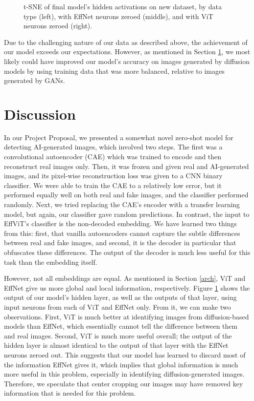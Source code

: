 \documentclass{article} %
\begin{document}
\begin{figure}[h]
\begin{center}
    \end{center}
    \caption{t-SNE of final model's hidden activations on new dataset, by data type (left), with EffNet neurons zeroed (middle), and with ViT neurons zeroed (right).}
    \label{fig:new_data_tsne}
\end{figure}

Due to the challenging nature of our data as described above, the achievement of our model exceeds our expectations. However, as mentioned in Section \ref{discussion}, we most likely could have improved our model's accuracy on images generated by diffusion models by using training data that was more balanced, relative to images generated by GANs.

\section{Discussion}
\label{discussion}

In our Project Proposal, we presented a somewhat novel zero-shot model for detecting AI-generated images, which involved two steps. The first was a convolutional autoencoder (CAE) which was trained to encode and then reconstruct real images only. Then, it was frozen and given real and AI-generated images, and its pixel-wise reconstruction loss was given to a CNN binary classifier. We were able to train the CAE to a relatively low error, but it performed equally well on both real and fake images, and the classifier performed randomly. Next, we tried replacing the CAE's encoder with a transfer learning model, but again, our classifier gave random predictions. In contrast, the input to EffViT's classifier is the non-decoded embedding. We have learned two things from this: first, that vanilla autoencoders cannot capture the subtle differences between real and fake images, and second, it is the decoder in particular that obfuscates these differences. The output of the decoder is much less useful for this task than the embedding itself.

However, not all embeddings are equal. As mentioned in Section \ref{arch}, ViT and EffNet give us more global and local information, respectively. Figure \ref{fig:new_data_tsne} shows the output of our model's hidden layer, as well as the outputs of that layer, using input neurons from each of ViT and EffNet only. From it, we can make two observations. First, ViT is much better at identifying images from diffusion-based models than EffNet, which essentially cannot tell the difference between them and real images. Second, ViT is much more useful overall; the output of the hidden layer is almost identical to the output of that layer with the EffNet neurons zeroed out. This suggests that our model has learned to discard most of the information EffNet gives it, which implies that global information is much more useful in this problem, especially in identifying diffusion-generated images. Therefore, we speculate that center cropping our images may have removed key information that is needed for this problem.
\end{document}
